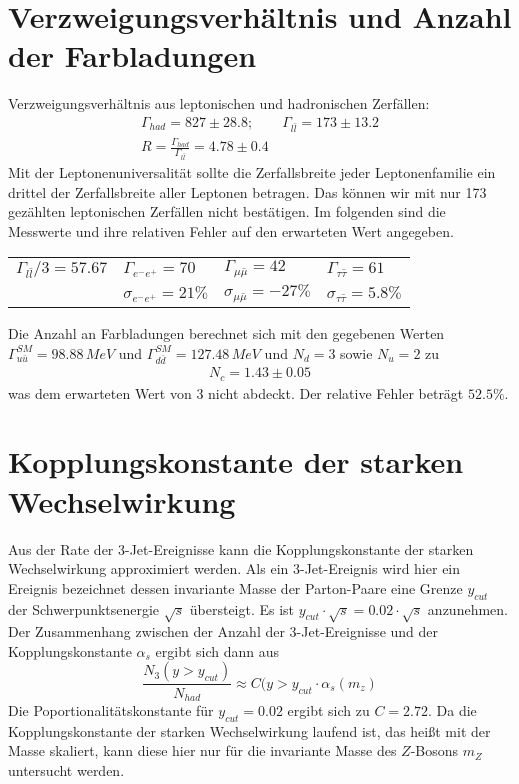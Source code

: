 \documentclass{include/thesisclass3}
\newcommand{\cc}{\cdot}
\newcommand{\e}[1]{\,\si{#1}}
\begin{document}
\section{Verzweigungsverhältnis und Anzahl der Farbladungen}
Verzweigungsverhältnis aus leptonischen und hadronischen Zerfällen:
\begin{align}
\Gamma_{had}=827\pm 28.8;\qquad \Gamma_{l\bar{l}}=173\pm 13.2\\
R=\frac{\Gamma_{had}}{\Gamma_{l\bar{l}}}=4.78\pm 0.4
\end{align}
Mit der Leptonenuniversalität sollte die Zerfallsbreite jeder Leptonenfamilie ein drittel der Zerfallsbreite aller Leptonen betragen. Das können wir mit nur 173 gezählten leptonischen Zerfällen nicht bestätigen. Im folgenden sind die Messwerte und ihre relativen Fehler auf den erwarteten Wert angegeben.
\begin{center}
\begin{tabular}{ l  l  l  l }
$\Gamma_{l\bar{l}}/3=57.67 $ & $\Gamma_{e^-e^+}=70$ & $\Gamma_{\mu\bar{\mu}}=42$ & $\Gamma_{\tau\bar{\tau}}=61$\\
& $\sigma_{e^-e^+}=21\%$ & $\sigma_{\mu\bar{\mu}}=-27\% $&$ \sigma_{\tau\bar{\tau}}=5.8\%$
\end{tabular}
\end{center}
Die Anzahl an Farbladungen berechnet sich mit den gegebenen Werten $\Gamma_{u\bar u}^{SM}=98.88\e{MeV}$ und $\Gamma_{d \bar d}^{SM}=127.48\e{MeV}$ und $N_d=3$ sowie $N_u=2$ zu
\begin{align}
N_c=1.43 \pm 0.05
\end{align}
was dem erwarteten Wert von 3 nicht abdeckt. Der relative Fehler beträgt $52.5\%$.

\section{Kopplungskonstante der starken Wechselwirkung}
Aus der Rate der $3$-Jet-Ereignisse kann die Kopplungskonstante der starken Wechselwirkung approximiert werden. Als ein $3$-Jet-Ereignis wird hier ein Ereignis bezeichnet dessen invariante Masse der Parton-Paare eine Grenze $y_{cut}$ der Schwerpunktsenergie $\sqrt{s}$ übersteigt. Es ist $y_{cut}\cc \sqrt{s} = 0.02 \cc \sqrt{s}$ anzunehmen. Der Zusammenhang zwischen der Anzahl der $3$-Jet-Ereignisse und der Kopplungskonstante $\alpha_s$ ergibt sich dann aus
\[ \frac{N_3(y > y_{cut})}{N_{had}} \approx C(y > y_{cut} \cc \alpha_s(m_z)\]
Die Poportionalitätskonstante für $y_{cut} = 0.02$ ergibt sich zu $C = 2.72$. Da die Kopplungskonstante der starken Wechselwirkung laufend ist, das heißt mit der Masse skaliert, kann diese hier nur für die invariante Masse des $Z$-Bosons $m_Z$ untersucht werden.
\end{document}

